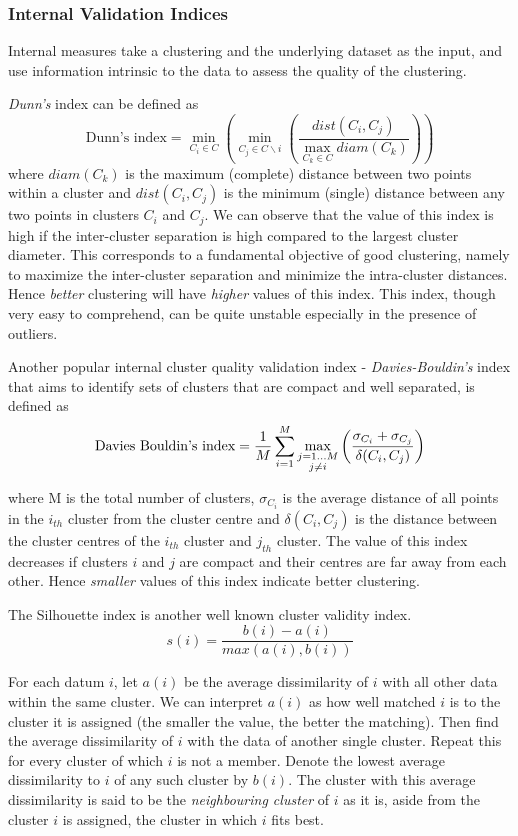 \subsubsection{Internal Validation Indices} \label{chap2:subsec:cluster_validity_internal}
Internal measures take a clustering and the underlying dataset as the input, and use information intrinsic to the data to assess the quality of the clustering. 

\textit{Dunn's} index can be defined as 
\[
\text{Dunn's index}= \min_{C_{i}\in C} \left( \min_{C_{j} \in C \backslash i} \left( \frac{dist(C_{i},C_{j})}{\max_{C_{k}\in C}diam(C_{k})} \right) \right)
\]
where $diam(C_{k})$ is the maximum (complete) distance between two points within a cluster and $dist(C_{i},C_{j})$ is the minimum (single) distance between any two points in clusters $C_{i}$ and $C_{j}$. We can observe that the value of this index is high if the inter-cluster separation is high compared to the largest cluster diameter. This corresponds to a fundamental objective of good clustering, namely to maximize the inter-cluster separation and minimize the intra-cluster distances. Hence \textit{better} clustering will have \textit{higher} values of this index. This index, though very easy to comprehend, can be quite unstable especially in the presence of outliers. 

Another popular internal cluster quality validation index - \textit{Davies-Bouldin's} index that aims to identify sets of clusters that are compact and well separated, is defined as
\[
\text{Davies Bouldin's index}=\frac{1}{M} \sum_{i=1}^{M}\max_{\begin{subarray}{c}j=1\dots M \\ j\neq i \end{subarray}} \left( \frac{\sigma_{C_{i}}+\sigma_{C_{j}}}{\delta(C_{i},C_{j})} \right)
\]

where M is the total number of clusters, $\sigma_{C_{i}}$ is the average distance of all points in the $i_{th}$ cluster from the cluster centre and $\delta(C_{i},C_{j})$ is the distance between the cluster centres of the $i_{th}$ cluster and $j_{th}$ cluster. The value of this index decreases if clusters $i$ and $j$ are compact and their centres are far away from each other. Hence \textit{smaller} values of this index indicate better clustering.

The Silhouette index is another well known cluster validity index.
\[
s(i)=\frac{b(i)-a(i)}{max(a(i),b(i))} 
\]

For each datum $i$, let $a(i)$ be the average dissimilarity of $i$ with all other data within the same cluster. We can interpret $a(i)$ as how well matched $i$ is to the cluster it 
is assigned (the smaller the value, the better the matching). Then find the average dissimilarity of $i$ with the data of another single cluster. Repeat this for every cluster of 
which $i$ is not a member. Denote the lowest average dissimilarity to $i$ of any such cluster by $b(i)$. The cluster with this average dissimilarity is said to be the 
\textit{neighbouring cluster} of $i$ as it is, aside from the cluster $i$ is assigned, the cluster in which $i$ fits best.

